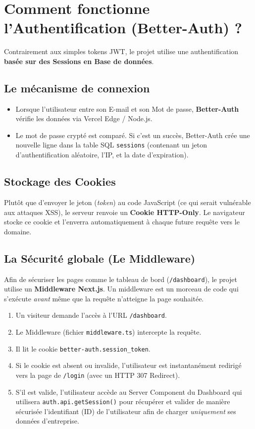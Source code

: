 \documentclass[12pt,a4paper]{article}
\begin{document}
\section{Comment fonctionne l'Authentification (Better-Auth) ?}
Contrairement aux simples tokens JWT, le projet utilise une authentification \textbf{basée sur des Sessions en Base de données}.

\subsection{Le mécanisme de connexion}
\begin{itemize}
    \item Lorsque l'utilisateur entre son E-mail et son Mot de passe, \textbf{Better-Auth} vérifie les données via Vercel Edge / Node.js.
    \item Le mot de passe crypté est comparé. Si c'est un succès, Better-Auth crée une nouvelle ligne dans la table SQL \texttt{sessions} (contenant un jeton d'authentification aléatoire, l'IP, et la date d'expiration).
\end{itemize}

\subsection{Stockage des Cookies}
Plutôt que d'envoyer le jeton (\textit{token}) au code JavaScript (ce qui serait vulnérable aux attaques XSS), le serveur renvoie un \textbf{Cookie HTTP-Only}. Le navigateur stocke ce cookie et l'enverra automatiquement à chaque future requête vers le domaine.

\subsection{La Sécurité globale (Le Middleware)}
Afin de sécuriser les pages comme le tableau de bord (\texttt{/dashboard}), le projet utilise un \textbf{Middleware Next.js}. Un middleware est un morceau de code qui s'exécute \textit{avant} même que la requête n'atteigne la page souhaitée.
\begin{enumerate}
    \item Un visiteur demande l'accès à l'URL \texttt{/dashboard}.
    \item Le Middleware (fichier \texttt{middleware.ts}) intercepte la requête.
    \item Il lit le cookie \texttt{better-auth.session\_token}.
    \item Si le cookie est absent ou invalide, l'utilisateur est instantanément redirigé vers la page de \texttt{/login} (avec un HTTP 307 Redirect).
    \item S'il est valide, l'utilisateur accède au Server Component du Dashboard qui utilisera \texttt{auth.api.getSession()} pour récupérer et valider de manière sécurisée l'identifiant (ID) de l'utilisateur afin de charger \textit{uniquement} ses données d'entreprise.
\end{enumerate}
\end{document}
